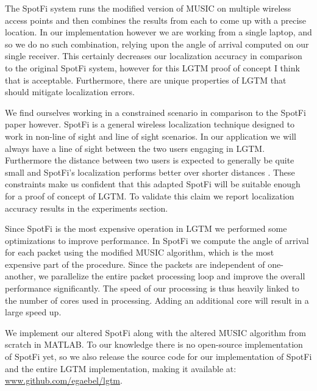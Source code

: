 \documentclass[12pt]{report}
\begin{document}
The SpotFi system runs the modified version of MUSIC on multiple wireless access points and then combines the results from each to come up with a precise location. In our implementation however we are working from a single laptop, and so we do no such combination, relying upon the angle of arrival computed on our single receiver. This certainly decreases our localization accuracy in comparison to the original SpotFi system, however for this LGTM proof of concept I think that is acceptable. Furthermore, there are unique properties of LGTM that should mitigate localization errors. \par

We find ourselves working in a constrained scenario in comparison to the SpotFi paper however. SpotFi is a general wireless localization technique designed to work in non-line of sight and line of sight scenarios. In our application we will always have a line of sight between the two users engaging in LGTM. Furthermore the distance between two users is expected to generally be quite small and SpotFi's localization performs better over shorter distances \cite{SpotFiKotaru2015}. These constraints make us confident that this adapted SpotFi will be suitable enough for a proof of concept of LGTM. To validate this claim we report localization accuracy results in the experiments section. \par

Since SpotFi is the most expensive operation in LGTM we performed some optimizations to improve performance. In SpotFi we compute the angle of arrival for each packet using the modified MUSIC algorithm, which is the most expensive part of the procedure. Since the packets are independent of one-another, we parallelize the entire packet processing loop and improve the overall performance significantly. The speed of our processing is thus heavily linked to the number of cores used in processing. Adding an additional core will result in a large speed up. \par

We implement our altered SpotFi along with the altered MUSIC algorithm from scratch in MATLAB. To our knowledge there is no open-source implementation of SpotFi yet, so we also release the source code for our implementation of SpotFi and the entire LGTM implementation, making it available at: \url{www.github.com/egaebel/lgtm}. \par
\end{document}

